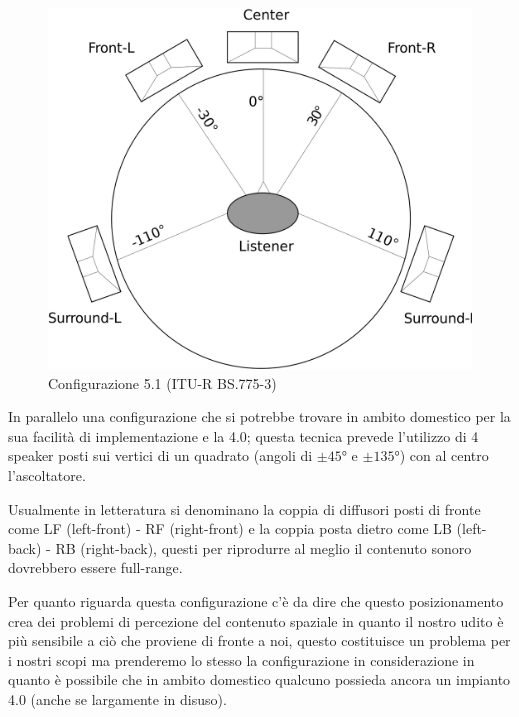 \documentclass[12pt,a4paper]{report}
\begin{document}
\begin{figure}[htbp]
	\centering
	\includegraphics[scale=0.18]{figures/5-1.png}
	\caption {Configurazione 5.1 (ITU-R BS.775-3)}
	\label{fig:5.1}
	\end{figure}

In parallelo una configurazione che si potrebbe trovare in ambito domestico per la sua facilità di implementazione e la 4.0; questa tecnica prevede l'utilizzo di 4 speaker posti sui vertici di un quadrato (angoli di $\pm45°$ e $\pm135°$) con al centro l'ascoltatore.

Usualmente in letteratura si denominano la coppia di diffusori posti di fronte come LF (left-front) - RF (right-front) e la coppia posta dietro come LB (left-back) - RB (right-back), questi per riprodurre al meglio il contenuto sonoro dovrebbero essere full-range.

Per quanto riguarda questa configurazione c'è da dire che questo posizionamento crea dei problemi di percezione del contenuto spaziale in quanto il nostro udito è più sensibile a ciò che proviene di fronte a noi, questo costituisce un problema per i nostri scopi ma prenderemo lo stesso la configurazione in considerazione in quanto è possibile che in ambito domestico qualcuno possieda ancora un impianto 4.0 (anche se largamente in disuso).
\end{document}
